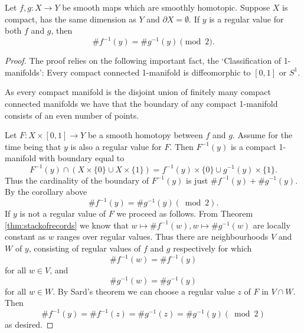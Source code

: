\documentclass[a4paper]{scrartcl}
\begin{document}
\begin{lemma}
    Let $f, g: X \rightarrow Y$ be smooth maps which are smoothly homotopic. Suppose $X$ is compact, has the same dimension as $Y$ and $\partial X=\emptyset$. If $y$ is a regular value for both $f$ and $g$, then
$$
\# f^{-1}(y)=\# g^{-1}(y) \pmod{2}.
$$
\end{lemma}
\begin{proof}
The proof relies on the following important fact, the `Classification of 1-manifolds': Every compact connected 1-manifold is diffeomorphic to $[0,1]$ or $S^{1}$.

As every compact manifold is the disjoint union of finitely many compact connected manifolds we have that the boundary of any compact 1-manifold consists of an even number of points.

Let $F: X \times[0,1] \rightarrow Y$ be a smooth homotopy between $f$ and $g$. Assume for the time being that $y$ is also a regular value for $F$. Then $F^{-1}(y)$ is a compact 1-manifold with boundary equal to
$$
F^{-1}(y) \cap(X \times\{0\} \cup X \times\{1\})=f^{-1}(y) \times\{0\} \cup g^{-1}(y) \times\{1\}.
$$
Thus the cardinality of the boundary of $F^{-1}(y)$ is just $\# f^{-1}(y)+\# g^{-1}(y)$. By the corollary above
$$
\# f^{-1}(y)=\# g^{-1}(y)(\bmod 2).
$$
If $y$ is not a regular value of $F$ we proceed as follows. From Theorem \ref{thm:stackofrecords} we know that $w \mapsto \# f^{-1}(w), w \mapsto \# g^{-1}(w)$ are locally constant as $w$ ranges over regular values. Thus there are neighbourhoods $V$ and $W$ of $y$, consisting of regular values of $f$ and $g$ respectively for which
$$
\# f^{-1}(w)=\# f^{-1}(y)
$$
for all $w \in V$, and
$$
\# g^{-1}(w)=\# g^{-1}(y)
$$
for all $w \in W$. By Sard's theorem we can choose a regular value $z$ of $F$ in $V \cap W$. Then
$$
\# f^{-1}(y)=\# f^{-1}(z)=\# g^{-1}(z)=\# g^{-1}(y)(\bmod 2)
$$
as desired.
\end{proof}
\end{document}
